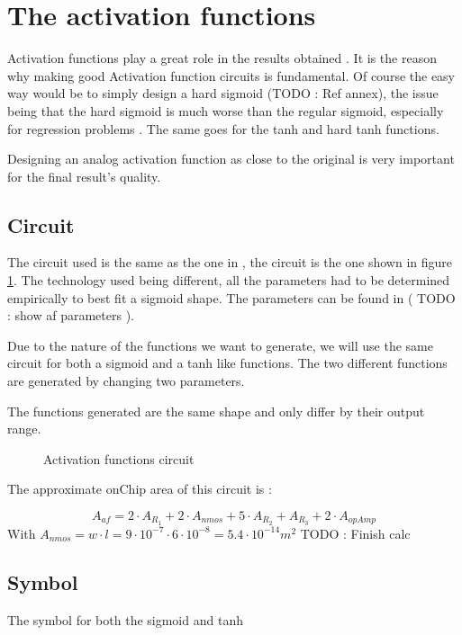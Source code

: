 \section{The activation functions}
\label{sec:af}

Activation functions play a great role in the results obtained \cite{af}. It is the reason why making good Activation function circuits is fundamental. Of course the easy way would be to simply design a hard sigmoid (TODO : Ref annex), the issue being that the hard sigmoid is much worse than the regular sigmoid, especially for regression problems \cite{hardSigm}. The same goes for the \ac{tanh} and hard \ac{tanh} functions.

Designing an analog activation function as close to the original is very important for the final result's quality.


\subsection{Circuit}

The circuit used is the same as the one in \cite{thesisRef}, the circuit is the one shown in figure \ref{fig:afCircuit}. The technology used being different, all the parameters had to be determined empirically to best fit a sigmoid shape. The parameters can be found in ( TODO : show af parameters ).

Due to the nature of the functions we want to generate, we will use the same circuit for both a sigmoid and a \ac{tanh} like functions. The two different functions are generated by changing two parameters.

The functions generated are the same shape and only differ by their output range.

\begin{figure}[H]
  \centering
  
  \caption{Activation functions circuit}
  \label{fig:afCircuit}
\end{figure}

The approximate onChip area of this circuit is :

\begin{equation}
  A_{af}=2\cdot A_{R_1} + 2\cdot A_{nmos} + 5\cdot A_{R_2} + A_{R_3} +2\cdot A_{opAmp}
\end{equation}
With $A_{nmos} = w\cdot l = 9\cdot 10^{-7} \cdot 6 \cdot 10^{-8} = 5.4 \cdot 10^{-14} m^2$
TODO : Finish calc

\subsection{Symbol}
The symbol for both the sigmoid and \ac{tanh}

